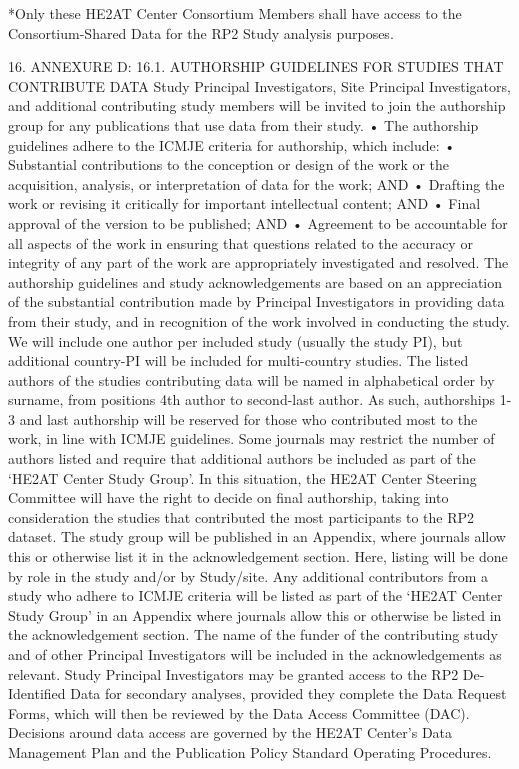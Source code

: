 \documentclass[12pt,letterpaper]{article}
\begin{document}
*Only these HE2AT Center Consortium Members shall have access to the Consortium-Shared Data for the RP2 Study analysis purposes.

16.	ANNEXURE D: 16.1.	AUTHORSHIP GUIDELINES FOR STUDIES THAT CONTRIBUTE DATA Study Principal Investigators, Site Principal Investigators, and additional contributing study members will be invited to join the authorship group for any publications that use data from their study. •	The authorship guidelines adhere to the ICMJE criteria for authorship, which include: •	Substantial contributions to the conception or design of the work or the acquisition, analysis, or interpretation of data for the work; AND •	Drafting the work or revising it critically for important intellectual content; AND •	Final approval of the version to be published; AND •	Agreement to be accountable for all aspects of the work in ensuring that questions related to the accuracy or integrity of any part of the work are appropriately investigated and resolved. The authorship guidelines and study acknowledgements are based on an appreciation of the substantial contribution made by Principal Investigators in providing data from their study, and in recognition of the work involved in conducting the study. We will include one author per included study (usually the study PI), but additional country-PI will be included for multi-country studies. The listed authors of the studies contributing data will be named in alphabetical order by surname, from positions 4th author to second-last author. As such, authorships 1-3 and last authorship will be reserved for those who contributed most to the work, in line with ICMJE guidelines. Some journals may restrict the number of authors listed and require that additional authors be included as part of the ‘HE2AT Center Study Group’. In this situation, the HE2AT Center Steering Committee will have the right to decide on final authorship, taking into consideration the studies that contributed the most participants to the RP2 dataset. The study group will be published in an Appendix, where journals allow this or otherwise list it in the acknowledgement section. Here, listing will be done by role in the study and/or by Study/site. Any additional contributors from a study who adhere to ICMJE criteria will be listed as part of the ‘HE2AT Center Study Group’ in an Appendix where journals allow this or otherwise be listed in the acknowledgement section. The name of the funder of the contributing study and of other Principal Investigators will be included in the acknowledgements as relevant. Study Principal Investigators may be granted access to the RP2 De-Identified Data for secondary analyses, provided they complete the Data Request Forms, which will then be reviewed by the Data Access Committee (DAC). Decisions around data access are governed by the HE2AT Center’s Data Management Plan and the Publication Policy Standard Operating Procedures.
\end{document}
